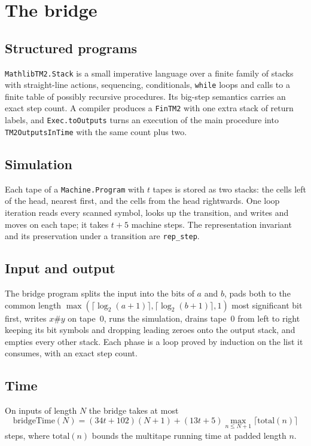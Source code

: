 \documentclass[11pt]{amsart}
\theoremstyle{remark}
\begin{document}
\section{The bridge}

\subsection*{Structured programs}
\texttt{MathlibTM2.Stack} is a small imperative language over a finite family of stacks with
straight-line actions, sequencing, conditionals, \texttt{while} loops and calls to a finite table
of possibly recursive procedures. Its big-step semantics carries an exact step count.
A compiler produces a \texttt{FinTM2} with one extra stack of return labels, and
\texttt{Exec.toOutputs} turns an execution of the main procedure into
\texttt{TM2OutputsInTime} with the same count plus two.

\subsection*{Simulation}
Each tape of a \texttt{Machine.Program} with $t$ tapes is stored as two stacks: the cells left of
the head, nearest first, and the cells from the head rightwards. One loop iteration reads every
scanned symbol, looks up the transition, and writes and moves on each tape; it takes $t+5$
machine steps. The representation invariant and its preservation under a transition are
\texttt{rep\_step}.

\subsection*{Input and output}
The bridge program splits the input into the bits of $a$ and $b$, pads both to the common length
$\max(\lceil\log_2(a+1)\rceil,\lceil\log_2(b+1)\rceil,1)$ most significant bit first, writes
$x\#y$ on tape~0, runs the simulation, drains tape~0 from left to right keeping its bit symbols
and dropping leading zeroes onto the output stack, and empties every other stack. Each phase is
a loop proved by induction on the list it consumes, with an exact step count.

\subsection*{Time}
On inputs of length $N$ the bridge takes at most
\[
\mathrm{bridgeTime}(N) = (34t+102)(N+1) + (13t+5)\max_{n\le N+1}\lceil \mathrm{total}(n)\rceil
\]
steps, where $\mathrm{total}(n)$ bounds the multitape running time at padded length $n$.
\end{document}
